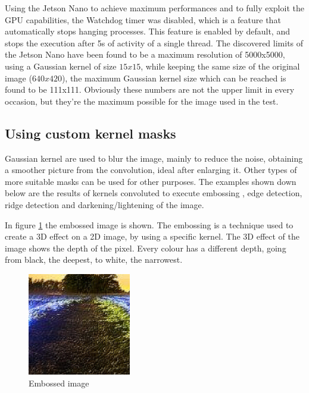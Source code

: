     Using the Jetson Nano to achieve maximum performances and to fully exploit the GPU capabilities, the Watchdog timer was disabled, which is a feature that 
    automatically stops hanging processes. This feature is enabled by default, and stops the execution after 5s of activity of a single thread.
    The discovered limits of the Jetson Nano have been found to be a maximum resolution of 5000x5000, using a Gaussian kernel of size $15x15$,  
    while keeping the same size of the original image ($640x420$), the maximum Gaussian kernel size which can be reached is found to be 111x111.
    Obviously these numbers are not the upper limit in every occasion, but they're the maximum possible for the image used in the test.

    \subsection{Using custom kernel masks}
    Gaussian kernel are used to blur the image, mainly to reduce the noise, obtaining a smoother picture from the convolution, ideal after
    enlarging it. Other types of more suitable masks can be used for other purposes.
    The examples shown down below are the results of kernels convoluted to execute embossing \cite{custom_kernels_a}, 
    edge detection, ridge detection \cite{custom_kernels_b} and darkening/lightening of the image.

    In figure \ref{fig:emboss} the embossed image is shown. The embossing is a technique used to create a 3D effect on a 2D image, 
    by using a specific kernel. The 3D effect of the image shows the depth of the pixel. Every colour has a different depth, going from black, the deepest, 
    to white, the narrowest.
    \begin{figure}[h]
        \centering
        \includegraphics[width=0.4\textwidth]{img/emboss/final.jpg}
        \caption{Embossed image}
        \label{fig:emboss}
    \end{figure}



